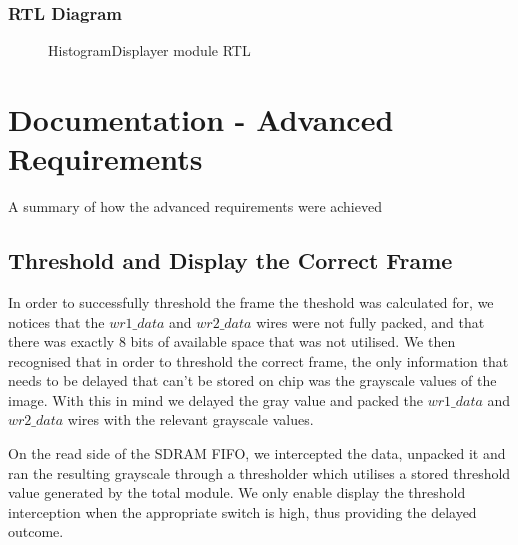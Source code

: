 \documentclass[12pt]{article}
\begin{document}
  \subsubsection{RTL Diagram}
    \begin{figure}[H]
    \caption{HistogramDisplayer module RTL}
    \label{fig:histogram_displayer_rtl}
  \end{figure}
  
  \section{Documentation - Advanced Requirements}
  A summary of how the advanced requirements were achieved
  
  \subsection{Threshold and Display the Correct Frame}
  In order to successfully threshold the frame the theshold was calculated for, we notices that the \(wr1\_data\) and \(wr2\_data\) wires were not fully packed, and that there was exactly 8 bits of available space that was not utilised. We then recognised that in order to threshold the correct frame, the only information that needs to be delayed that can't be stored on chip was the grayscale values of the image. With this in mind we delayed the gray value and packed the \(wr1\_data\) and \(wr2\_data\) wires with the relevant grayscale values.

  On the read side of the SDRAM FIFO, we intercepted the data, unpacked it and ran the resulting grayscale through a thresholder which utilises a stored threshold value generated by the total module. We only enable display the threshold interception when the appropriate switch is high, thus providing the delayed outcome.
\end{document}
